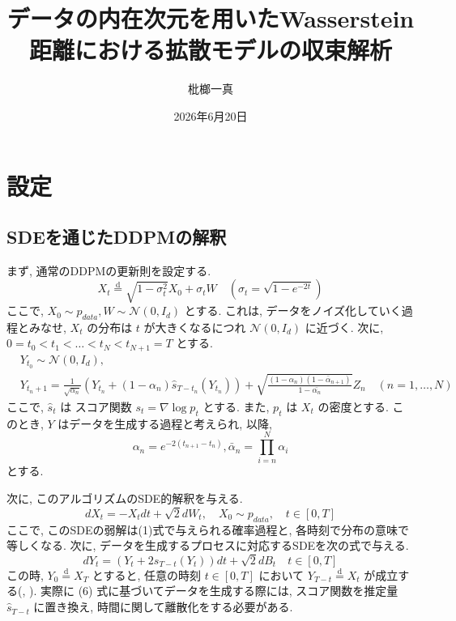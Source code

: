 \documentclass[11pt,a4paper]{ltjsarticle}
\title{データの内在次元を用いたWasserstein距離における拡散モデルの収束解析}
\author{枇榔一真}
\date{2026年6月20日}
\theoremstyle{remark}
\begin{document}
\maketitle
\section{設定}
\subsection{SDEを通じたDDPMの解釈}
まず, 通常のDDPMの更新則を設定する. 
\begin{equation}
    X_t\stackrel{\mathrm{d}}{=}\sqrt{1-\sigma^2_t}X_0+\sigma_tW \quad (\sigma_t=\sqrt{1-e^{-2t}})
\end{equation}
ここで, $X_0 \sim p_{data}, W\sim \mathcal{N}(0,I_d)$ とする.
これは, データをノイズ化していく過程とみなせ, $X_t$ の分布は $t$ が大きくなるにつれ $\mathcal{N}(0,I_d)$ に近づく.
次に, $0=t_0<t_1<\dots < t_N<t_{N+1}=T$ とする.
\begin{align}
    &Y_{t_0}\sim \mathcal{N}(0,I_d), \\
    &Y_{t_n+1}=\frac{1}{\sqrt{\alpha_n}}(Y_{t_n}+(1-\alpha_n)\hat{s}_{T-t_n}(Y_{t_n}))+\sqrt{\frac{(1-\alpha_n)(1-\bar{\alpha}_{n+1})}{1-\bar{\alpha_n}}}Z_n\quad(n=1,\dots, N)
\end{align}
ここで, $\hat{s}_t$ は スコア関数 $s_t=\nabla \log{p_{t}}$ とする. また, $p_t$ は $X_t$ の密度とする.
このとき, $Y$ はデータを生成する過程と考えられ, 
以降, 
\begin{equation}
    \alpha_n=e^{-2(t_{n+1}-t_n)}, \bar{\alpha}_n=\prod_{i=n}^N \alpha_i
\end{equation}
とする.


次に, このアルゴリズムのSDE的解釈を与える.
\begin{equation}
    dX_t=-X_tdt+\sqrt{2}dW_t, \quad X_0\sim p_{data}, \quad t\in[0,T]
\end{equation}
ここで, このSDEの弱解は(1)式で与えられる確率過程と, 各時刻で分布の意味で等しくなる.
次に, データを生成するプロセスに対応するSDEを次の式で与える.
\begin{equation}
    dY_t=(Y_t+2s_{T-t}(Y_t))dt+\sqrt{2}dB_t \quad t\in[0,T]
\end{equation}
この時, $Y_0\stackrel{\mathrm{d}}{=} X_T$ とすると, 任意の時刻 $t\in [0,T]$ において
$Y_{T-t}\stackrel{\mathrm{d}}{=}X_t$ が成立する(\cite{anderson1982reverse}, \cite{haussmann1986time}).
実際に (6) 式に基づいてデータを生成する際には, スコア関数を推定量 $\hat{s}_{T-t}$ に置き換え, 時間に関して離散化をする必要がある.
\end{document}
